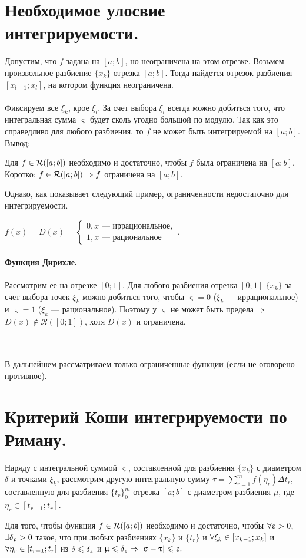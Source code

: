 \section{Необходимое улосвие интегрируемости.}
Допустим, что $f$ задана на $[a;b]$, но неограничена на этом отрезке. Возьмем произвольное разбиение $\{x_k\}$ отрезка $[a;b]$. Тогда найдется отрезок разбиения $[x_{l-1};x_l]$, на котором функция неограничена.\\\\
Фиксируем все $\xi_k$, крое $\xi_l$. За счет выбора $\xi_l$ всегда можно добиться того, что интегральная сумма $\upvarsigma$ будет сколь угодно большой по модулю. Так как это справедливо для любого разбиения, то $f$ не может быть интегрируемой на $[a;b]$. Вывод:
\begin{theorem}
	Для $f\in\mathcal{R}([a; b])$ необходимо и достаточно, чтобы $f$ была ограничена на $[a;b]$. Коротко: $f\in\mathcal{R}([a; b]) \Rightarrow f$ ограничена на $[a;b]$.
\end{theorem}
Однако, как показывает следующий пример, ограниченности недостаточно для  интегрируемости.\\
\begin{example}
	$f(x) = D(x) = \begin{cases}0, x\text{ --- иррациональное},\\
		1, x\text{ --- рациональное}
	\end{cases}$.\\\\
	\textbf{Функция Дирихле.}\\\\
	Рассмотрим ее на отрезке $[0;1]$. Для любого разбиения отрезка $[0;1]$ $\{x_k\}$ за счет выбора точек $\xi_k$ можно добиться того, чтобы $\upvarsigma = 0$ ($\xi_k$ --- иррациональное) и $\upvarsigma = 1$ ($\xi_k$ --- рациональное). Пoэтому у $\upvarsigma$ не может быть предела $\Rightarrow$ $D(x) \not\in\mathcal{R}([0;1])$, хотя $D(x)$ и ограничена.
\end{example}\\\\
В дальнейшем рассматриваем только ограниченные функции (если не оговорено противное).
\section{Критерий Коши интегрируемости по Риману.}
Наряду с интегральной суммой $\upvarsigma$, составленной для разбиения $\{x_k\}$ с диаметром $\delta$ и точками $\xi_k$, рассмотрим другую интегральную сумму $\tau = \sum\limits^m_{r=1}f(\eta_r)\Delta t_r$, составленную для разбиения $\{t_r\}^m_0$ отрезка $[a;b]$ с диаметром разбиения $\mu$, где $\eta_r \in [t_{r-1};t_r]$.
\begin{theorem}
	Для того, чтобы функция $f\in\mathcal{R}([a; b])$ необходимо и достаточно, чтобы $\forall \upvarepsilon > 0$, $\exists \delta_\upvarepsilon > 0$ такое, что при любых разбиениях $\{x_k\}$ и $\{t_r\}$ и $\forall \xi_k \in [x_{k-1}; x_k]$ и $\forall \eta_r\in [t_{r-1};t_r]$ из $\delta \leqslant \delta_\upvarepsilon$ и $\upmu \leqslant \delta_\upvarepsilon\Rightarrow |\upvarsigma - \uptau| \leqslant \upvarepsilon.$
\end{theorem}\begin{Proof}
	
\end{Proof}
